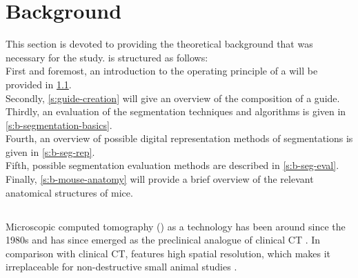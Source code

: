 

\chapter{Background}\label{c:background}
This section is devoted to providing the theoretical background that was necessary for the study.
 is structured as follows:\\
First and foremost, an introduction to the operating principle of a \mct\space will be provided in \cref{s:b-microct}.\\
Secondly, \cref{s:guide-creation} will give an overview of the composition of a guide.\\
Thirdly, an evaluation of the segmentation techniques and algorithms is given in \cref{s:b-segmentation-basics}.\\
Fourth, an overview of possible digital representation methods of segmentations is given in \cref{s:b-seg-rep}.\\
Fifth, possible segmentation evaluation methods are described in \cref{s:b-seg-eval}.\\
Finally, \cref{s:b-mouse-anatomy} will provide a brief overview of the relevant anatomical structures of mice.


\section{\mct}\label{s:b-microct}
Microscopic computed tomography (\mct) as a technology has been around since the 1980s and has since emerged as the preclinical analogue of clinical CT \cite{clarkAdvancesMicroCTImaging2021,ritmanCurrentStatusDevelopments2011}.
In comparison with clinical CT, \mct\space features high spatial resolution, which makes it irreplaceable for non-destructive small animal studies \cite{clarkAdvancesMicroCTImaging2021,ritmanCurrentStatusDevelopments2011,keklikoglouMicroCTBiologicalBiomedical2021}.


